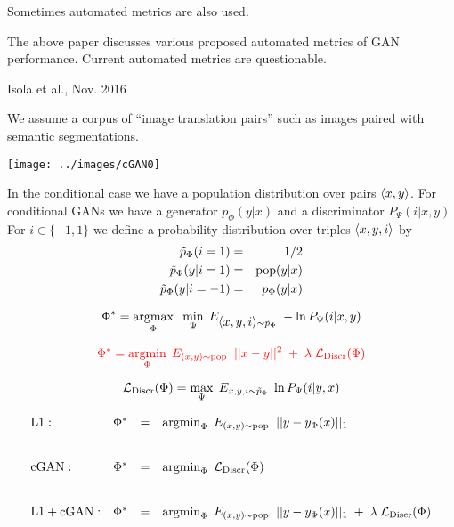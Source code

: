 {\vfill
Sometimes automated metrics are also used.

\vfill
The above paper discusses various proposed automated metrics of GAN performance.  Current automated metrics are questionable.


{Isola et al., Nov. 2016}

We assume a corpus of ``image translation pairs'' such as images paired with semantic segmentations.

\centerline{\texttt{[image: ../images/cGAN0]}}

In the conditional case we have a population distribution over pairs ${\mbox{$\langle x,y\rangle$}}$.
For conditional GANs we have a generator $p_\Phi(y|x)$ and a discriminator $P_\Psi(i|x,y)$
For $i \in \{-1,1\}$ we define a probability distribution over triples
${\mbox{$\langle x,y,i\rangle$}}$ by
\begin{eqnarray*}
\tilde{p}_\Phi(i = 1) & = & 1/2 \\
\tilde{p}_\Phi(y|i=1) & =&  \mathrm{pop}(y|x) \\
\tilde{p}_\Phi(y|i=-1) & = & p_\Phi(y|x)
\end{eqnarray*}

{\color{red} $$\Phi^* = \operatorname*{argmax}_\Phi\;\;\min_\Psi\;E_{{\mbox{$\langle x,y,i\rangle$}} \sim \tilde{p}_\Phi}\;-\ln P_\Psi(i|x,y)$$}


$${\color{red} \Phi^* = \operatorname*{argmin}_\Phi\;E_{(x,y) \sim \mathrm{pop}}\;\; ||x - y||^2\; + \; \lambda\; {\cal L}_{\mathrm{Discr}}(\Phi)}$$

\vfill
$${\cal L}_\mathrm{Discr}(\Phi) = \max_\Psi \;E_{x,y,i \sim \tilde{p}_\Phi}\; \ln P_\Psi(i|y,x)$$


{\huge
$$\begin{array}{lrcl}
\mathrm{L1:} & \Phi^* & = & \operatorname*{argmin}_\Phi\;E_{(x,y) \sim \mathrm{pop}}\;\; ||y - y_\Phi(x)||_1 \\
\\
\\
\mathrm{cGAN:} & \Phi^* & = & \operatorname*{argmin}_\Phi\;{\cal L}_{\mathrm{Discr}}(\Phi) \\
\\
\\
\mathrm{L1 + cGAN:} & \Phi^* & = & \operatorname*{argmin}_\Phi\;E_{(x,y) \sim \mathrm{pop}}\;\; ||y - y_\Phi(x)||_1\; +\; \lambda\; {\cal L}_\mathrm{Discr}(\Phi)
\end{array}$$
}


}
